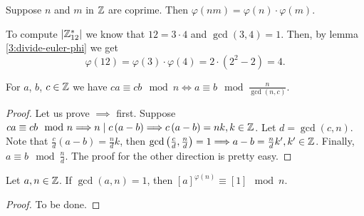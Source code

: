 \begin{lemma}\label{3:divide-euler-phi}
    Suppose $n$ and $m$ in $\mathbb{Z}$ are coprime. Then $\varphi\left( nm \right) = \varphi\left( n \right) \cdot
    \varphi\left( m \right) $.
\end{lemma}

\begin{example}
    To compute $\left\vert \mathbb{Z}^*_{12} \right\vert$ we know that $12 = 3\cdot 4$ and $\gcd\left( 3, 4 \right) = 1$. Then,
    by lemma \ref{3:divide-euler-phi} we get
    \begin{equation}
        \varphi\left( 12 \right) = \varphi\left( 3 \right) \cdot \varphi\left( 4 \right) = 2\cdot \left(
        2^2 - 2\right) = 4.
    \end{equation}
\end{example}

\begin{prop}
    For $a$, $b$, $c\in\mathbb{Z}$ we have $ca\equiv cb \mod n \iff a\equiv b\mod \frac{n}{\gcd\left( n, c \right) }$.
\end{prop}

\begin{proof}
    Let us prove $\implies$ first. Suppose $ca\equiv cb\mod n\Longrightarrow n\mid c\left( a - b \right) \Longrightarrow c\left( a - b \right) = nk, k\in\mathbb{Z}$. Let $d = \gcd\left( c, n \right) $. Note that $\frac{c}{d}\left( a - b \right) = \frac{n}{d}k$, then $\gcd\left( \frac{c}{d}, \frac{n}{d} \right) = 1\Longrightarrow a - b = \frac{n}{d}k', k'\in\mathbb{Z}$.
    Finally, $a\equiv b\mod \frac{n}{d}$. The proof for the other direction is pretty easy.
\end{proof}


\begin{theorem}
    Let $a, n\in\mathbb{Z}$. If $\gcd\left( a, n \right) = 1$, then $[a]^{\varphi\left(
    n\right) }\equiv[1]\mod n$.
\end{theorem}

\begin{proof}
    To be done.
\end{proof}


